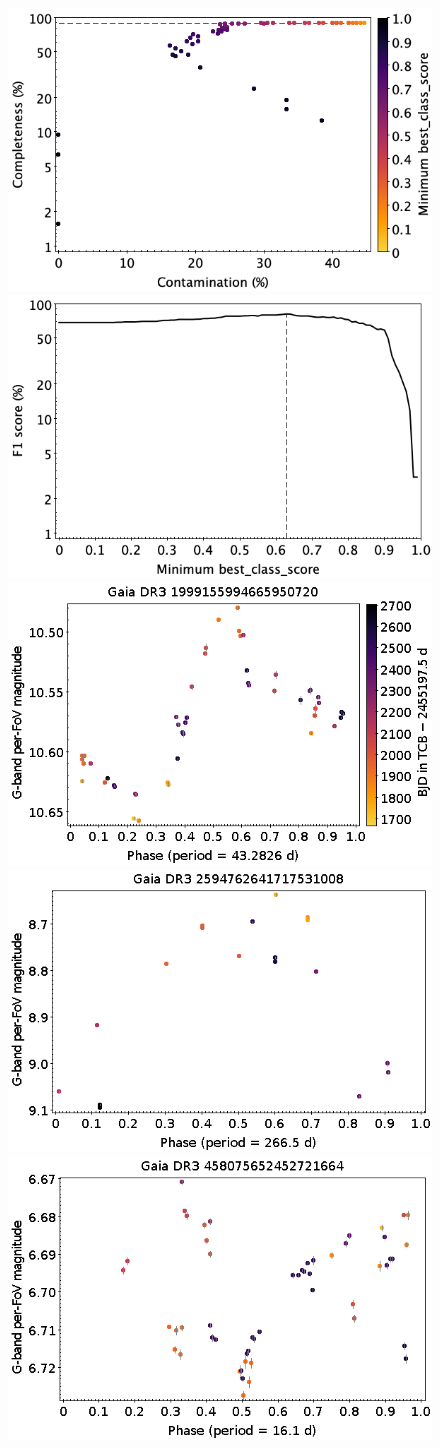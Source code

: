 \documentclass[longauth]{aa}
\begin{document}
\begin{appendix}
\begin{figure}
\centering
{} \includegraphics[width=0.45\hsize]{figures/appendix/ACYG_cls_scc.png}  
\hspace{2mm}
 \includegraphics[width=0.45\hsize]{figures/appendix/ACYG_cls_sf1.png} \\ 
\vspace{4mm}
 \includegraphics[width=0.45\hsize]{figures/appendix/ACYG-2.png}  
\hspace{2mm}
 \includegraphics[width=0.45\hsize]{figures/appendix/ACYG-8.png} \\
\vspace{4mm}
 \includegraphics[width=0.45\hsize]{figures/appendix/ACYG-18.png}  

\end{figure}
\end{appendix}
\end{document}
